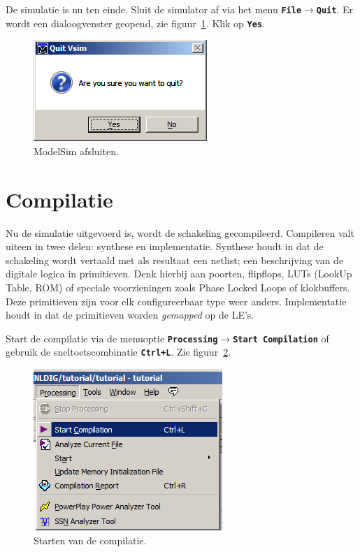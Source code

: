 \documentclass[a4paper,12pt,fleqn,twoside]{book}
\def\tutpicscale{0.455}
\newcommand{\menu}[1]{\texttt{\textbf{#1}}}
\newcommand{\knop}[1]{\texttt{\textbf{#1}}}
\def\pijl{$\rightarrow$}%
\begin{document}
De simulatie is nu ten einde. Sluit de simulator af via het menu
\menu{File\pijl{}Quit}. Er wordt een dialoogvenster geopend, zie
figuur~\ref{fig:046wantoquit}. Klik op \knop{Yes}.

\begin{figure}[H]
\centering
\includegraphics[scale=\tutpicscale]{046wantoquit}
\caption{ModelSim afsluiten.}
\label{fig:046wantoquit}
\end{figure}


\section{Compilatie}
\label{sec:compilatie}
Nu de simulatie uitgevoerd is, wordt de schakeling gecompileerd. Compileren
valt uiteen in twee delen: synthese en implementatie. Synthese houdt in dat de
schakeling wordt vertaald met als resultaat een netlist; een beschrijving van
de digitale logica in primitieven. Denk hierbij aan poorten, flipflops, LUTs
(LookUp Table, ROM) of speciale voorzieningen zoals Phase Locked Loops of
klokbuffers. Deze primitieven zijn voor elk configureerbaar type weer anders. 
Implementatie houdt in dat de primitieven worden \textsl{gemapped} op de LE's.

Start de compilatie via de menuoptie \menu{Processing\pijl{}Start Compilation}
of gebruik de sneltoetscombinatie \knop{Ctrl+L}.
Zie figuur~\ref{fig:050startcompilation}.

\begin{figure}[H]
\centering
\includegraphics[scale=\tutpicscale]{050startcompilation}
\caption{Starten van de compilatie.}
\label{fig:050startcompilation}
\end{figure}
\end{document}
